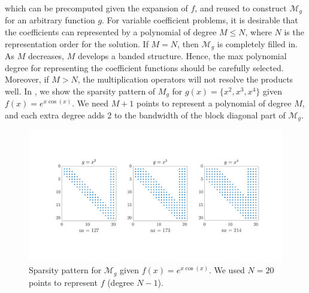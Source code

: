 which can be precomputed given the expansion of $f$, and reused to construct $\mathcal{M}_g$ for an arbitrary function $g$. 
For variable coefficient problems, it is desirable that the coefficients can represented by a polynomial of degree $M \leq N$, where $N$ is the representation order for the solution. If $M=N$, then $\mathcal{M}_g$ is completely filled in. As $M$ decreases, $M$ develops a banded structure. Hence, the max polynomial degree for representing the coefficient functions should be carefully selected. Moreover, if $M > N$, the multiplication operators will not resolve the products well. In , we show the sparsity pattern of $M_g$ for $g(x) = \{x^2,x^3,x^4\}$ given $f(x) = e^{x\cos(x)}$. We need $M+1$ points to represent a polynomial of degree $M$, and each extra degree adds 2 to the bandwidth of the block diagonal part of $\mathcal{M}_g$. 
\begin{figure}[H]
	\centering
	\includegraphics[width=\linewidth,trim=4cm 4cm 4cm 4cm,clip]{figures/Mg_sparse}
	\caption{Sparsity pattern for $\mathcal{M}_g$ given $f(x) = e^{x\cos(x)}$. We used $N=20$ points to represent $f$ (degree $N-1$).}\label{fig1}
\end{figure}

